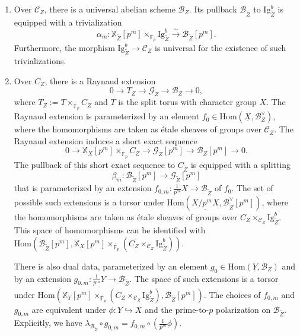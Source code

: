 \documentclass[letterpaper,11pt]{amsart}
\begin{document}
 \begin{enumerate}
     \item Over $\mathscr{C}_{Z}$, there is a universal abelian scheme $\mathcal{B}_{Z}$. Its pullback $\mathcal{B}_{\widetilde{Z}}$ to $\mathrm{Ig}^b_{\widetilde{Z}}$ is equipped with a trivialization 
     \[
     \alpha_m: \mathbb{X}_{\widetilde{Z}}[p^m]\times_{\overline{\mathbb{F}}_p} \mathrm{Ig}^b_{\widetilde{Z}} \stackrel{\sim}{\to} \mathcal{B}_{\widetilde{Z}}[p^m]. 
     \]
     Furthermore, the morphism $\mathrm{Ig}^b_{\widetilde{Z}}\to \mathscr{C}_Z$ is universal for the existence of such trivializations. 
     \item Over $C_{Z}$, there is a Raynaud extension 
     \[
     0\to T_Z\to \mathcal{G}_Z \to \mathcal{B}_Z\to  0,
     \]
     where $T_Z:=T\times_{\overline{\mathbb{F}}_p} C_Z$ and $T$ is the split torus with character group $X$. The Raynaud extension is parameterized by an element $f_0\in \mathrm{Hom}(\underline{X}, \mathcal{B}^\vee_{Z})$, where the homomorphisms are taken as \'etale sheaves of groups over $\mathscr{C}_Z$. The Raynaud extension induces a short exact sequence 
     \[
     0\to \mathbb{X}_{X}[p^m]\times_{\overline{\mathbb{F}}_p}C_Z\to \mathcal{G}_Z[p^m]\to \mathcal{B}_{Z}[p^m]\to 0.
     \]
     The pullback of this short exact sequence to $C_{\widetilde{Z}}$ is equipped with a splitting 
     \[
     \beta_m: \mathcal{B}_{\widetilde{Z}}[p^m]\to \mathcal{G}_{\widetilde{Z}}[p^m]
     \] 
     that is parameterized by an extension $f_{0,m}: \frac{1}{p^m} X\to \mathcal{B}_{\widetilde{Z}}$ of $f_0$. The set of possible such extensions is a torsor under $\mathrm{Hom}\left(\underline{X/p^mX}, \mathcal{B}^\vee_{\widetilde{Z}}[p^m]\right)$, where the homomorphisms are taken as \'etale sheaves of groups over $C_Z\times_{\mathscr{C}_Z}\mathrm{Ig}^b_{\widetilde{Z}}$. This space of homomorphisms can be identified with $\mathrm{Hom}\left(\mathcal{B}_{\widetilde{Z}}[p^m], \mathbb{X}_{X}[p^m]\times_{\overline{\mathbb{F}}_p}\left(C_Z\times_{\mathscr{C}_Z}\mathrm{Ig}^b_{\widetilde{Z}}\right)\right)$. 
     
There is also dual data, parameterized by an element $g_0\in \mathrm{Hom}(\underline{Y}, \mathcal{B}_Z)$ and by an extension $g_{0,m}:\underline{\frac{1}{p^m} Y}\to \mathcal{B}_{\widetilde{Z}}$. The space of such extensions is a torsor under $\mathrm{Hom}\left(\mathbb{X}_Y[p^m]\times_{\overline{\mathbb{F}}_p} \left(C_Z\times_{\mathscr{C}_Z}\mathrm{Ig}^b_{\widetilde{Z}}\right),\mathcal{B}_{\widetilde{Z}}[p^m]\right)$. The choices of $f_{0,m}$ and $g_{0,m}$ are equivalent under $\phi: Y\hookrightarrow X$ and the prime-to-$p$ polarization on $\mathcal{B}_{\widetilde{Z}}$. Explicitly, we have $\lambda_{\mathcal{B}_{\widetilde{Z}}}\circ g_{0,m} = f_{0,m}\circ (\frac{1}{p^m}\phi)$.    


\end{enumerate}
\end{document}
